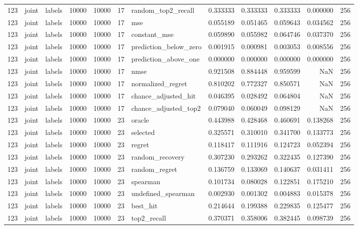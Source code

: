 \begin{tabular}{rllrrrlrrrrr}
123 & joint & labels & 10000 & 10000 & 17 & random_top2_recall & 0.333333 & 0.333333 & 0.333333 & 0.000000 & 256 \\
123 & joint & labels & 10000 & 10000 & 17 & mse & 0.055189 & 0.051465 & 0.059643 & 0.034562 & 256 \\
123 & joint & labels & 10000 & 10000 & 17 & constant_mse & 0.059890 & 0.055982 & 0.064746 & 0.037370 & 256 \\
123 & joint & labels & 10000 & 10000 & 17 & prediction_below_zero & 0.001915 & 0.000981 & 0.003053 & 0.008556 & 256 \\
123 & joint & labels & 10000 & 10000 & 17 & prediction_above_one & 0.000000 & 0.000000 & 0.000000 & 0.000000 & 256 \\
123 & joint & labels & 10000 & 10000 & 17 & nmse & 0.921508 & 0.884448 & 0.959599 & NaN & 256 \\
123 & joint & labels & 10000 & 10000 & 17 & normalized_regret & 0.810202 & 0.772327 & 0.850571 & NaN & 256 \\
123 & joint & labels & 10000 & 10000 & 17 & chance_adjusted_hit & 0.046395 & 0.028492 & 0.064804 & NaN & 256 \\
123 & joint & labels & 10000 & 10000 & 17 & chance_adjusted_top2 & 0.079040 & 0.060049 & 0.098129 & NaN & 256 \\
123 & joint & labels & 10000 & 10000 & 23 & oracle & 0.443988 & 0.428468 & 0.460691 & 0.138268 & 256 \\
123 & joint & labels & 10000 & 10000 & 23 & selected & 0.325571 & 0.310010 & 0.341700 & 0.133773 & 256 \\
123 & joint & labels & 10000 & 10000 & 23 & regret & 0.118417 & 0.111916 & 0.124723 & 0.052394 & 256 \\
123 & joint & labels & 10000 & 10000 & 23 & random_recovery & 0.307230 & 0.293262 & 0.322435 & 0.127390 & 256 \\
123 & joint & labels & 10000 & 10000 & 23 & random_regret & 0.136759 & 0.133069 & 0.140637 & 0.031411 & 256 \\
123 & joint & labels & 10000 & 10000 & 23 & spearman & 0.101734 & 0.080028 & 0.122851 & 0.175210 & 256 \\
123 & joint & labels & 10000 & 10000 & 23 & undefined_spearman & 0.002930 & 0.001302 & 0.004883 & 0.015378 & 256 \\
123 & joint & labels & 10000 & 10000 & 23 & best_hit & 0.214644 & 0.199388 & 0.229835 & 0.125477 & 256 \\
123 & joint & labels & 10000 & 10000 & 23 & top2_recall & 0.370371 & 0.358006 & 0.382445 & 0.098739 & 256 \\

\end{tabular}

